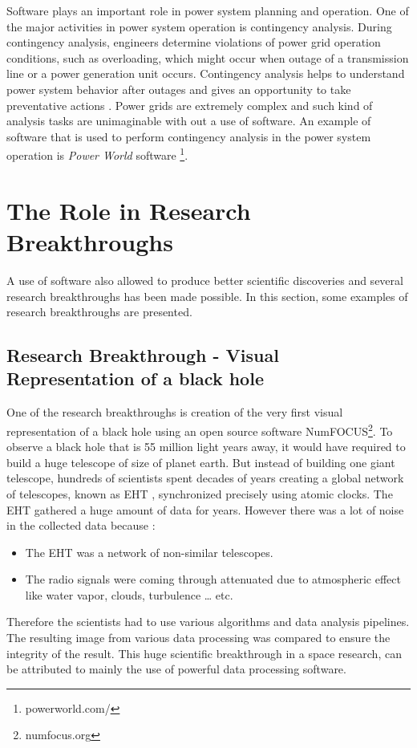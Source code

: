 Software plays an important role in power system planning and operation. One of the major activities in power system operation is contingency analysis. During contingency analysis, engineers determine violations of power grid operation conditions, such as overloading, which might occur when outage of a transmission line or a power generation unit occurs. Contingency analysis helps to understand power system behavior after outages and gives an opportunity to take preventative actions \citep{mishra2012contingency}. Power grids are extremely complex and such kind of analysis tasks are unimaginable with out a use of software. An example of software that is used to perform contingency analysis in the power system operation is \emph{Power World} software  \footnote{powerworld.com/}.  

%

\section{The Role in Research Breakthroughs  }
\label{sec:background:second_section}
A use of software also allowed to produce better scientific discoveries and several research breakthroughs has been made possible\citep{goble2014better}. In this section, some examples of research breakthroughs are presented.

\subsection{Research Breakthrough - Visual Representation of a black hole  }

One of the research breakthroughs is creation of the very first visual representation of a black hole using an open source software NumFOCUS\footnote{numfocus.org}. To observe a black hole that is 55 million light years away, it would have required to build a huge telescope of size of planet earth. But instead of building one giant telescope, hundreds of scientists spent decades of years creating a global network of telescopes, known as \ac{EHT} \citep{enwiki:1052167868}, synchronized precisely using atomic clocks. The \ac{EHT} gathered a huge amount of data for years. However there was a lot of noise in the collected data because :


\vspace{-1mm}   %
	\begin{itemize}%
		\item The \ac{EHT} was a network of non-similar telescopes.
		\item The radio signals were coming through attenuated due to atmospheric effect like water vapor, clouds, turbulence … etc.
	\end{itemize}
Therefore the scientists had to use various algorithms and data analysis pipelines. The resulting image from various data processing was compared to ensure the integrity of the result. This huge scientific breakthrough in a space research, can be attributed to mainly the use of powerful data processing software. 

